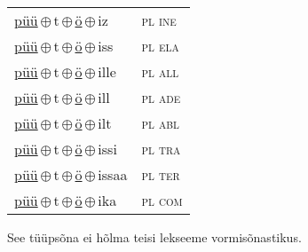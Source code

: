 \begin{minipage}{\textwidth}
\begin{sideways}
\begin{tabular}{l l}
\underline{püü}\,$\oplus$\,t\,$\oplus$\,\underline{ö}\,$\oplus$\,iz & \textsc{ pl ine } \\
\underline{püü}\,$\oplus$\,t\,$\oplus$\,\underline{ö}\,$\oplus$\,iss & \textsc{ pl ela } \\
\underline{püü}\,$\oplus$\,t\,$\oplus$\,\underline{ö}\,$\oplus$\,ille & \textsc{ pl all } \\
\underline{püü}\,$\oplus$\,t\,$\oplus$\,\underline{ö}\,$\oplus$\,ill & \textsc{ pl ade } \\
\underline{püü}\,$\oplus$\,t\,$\oplus$\,\underline{ö}\,$\oplus$\,ilt & \textsc{ pl abl } \\
\underline{püü}\,$\oplus$\,t\,$\oplus$\,\underline{ö}\,$\oplus$\,issi & \textsc{ pl tra } \\
\underline{püü}\,$\oplus$\,t\,$\oplus$\,\underline{ö}\,$\oplus$\,issaa & \textsc{ pl ter } \\
\underline{püü}\,$\oplus$\,t\,$\oplus$\,\underline{ö}\,$\oplus$\,ika & \textsc{ pl com } \\
\end{tabular}
\end{sideways}
\label{tab:tüüpsõnamall-püütö}

\end{minipage}

 
\vspace{1em}
\noindent See tüüpsõna ei hõlma teisi lekseeme vormi\-sõnastikus.
